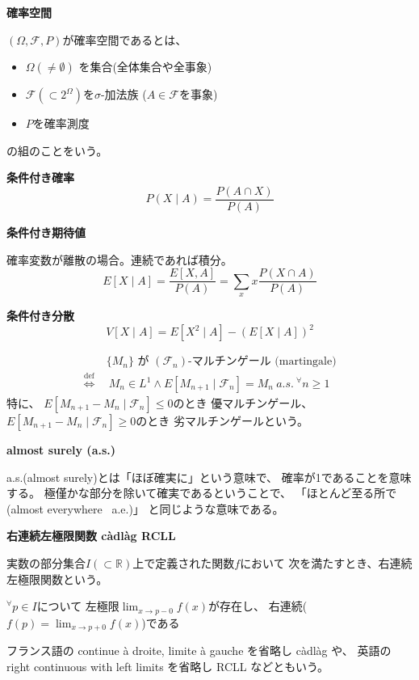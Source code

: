\documentclass[12pt,b5paper]{ltjsarticle}
\begin{document}
\hrulefill

\textbf{確率空間}

$(\Omega,\mathcal{F},P)$が確率空間であるとは、
\begin{itemize}
 \item $\Omega(\ne \emptyset)$ を集合(全体集合や全事象)
 \item $\mathcal{F}(\subset 2^{\Omega})$を$\sigma$-加法族
       ($A\in\mathcal{F}$を事象)
 \item $P$を確率測度
\end{itemize}
の組のことをいう。


\textbf{条件付き確率}
\begin{equation}
 P(X\mid A) = \frac{P(A\cap X)}{P(A)}
\end{equation}

\textbf{条件付き期待値}

確率変数が離散の場合。連続であれば積分。
\begin{equation}
 E[X\mid A] = \frac{E[X,A]}{P(A)}
  = \sum_{x}x\frac{P(X \cap A)}{P(A)}
\end{equation}

\textbf{条件付き分散}
\begin{equation}
 V[X\mid A]
  = E[X^2 \mid A] - (E[X\mid A])^2
\end{equation}

\textbf{
}

\begin{align}
 & \{M_{n}\}\text{ が }(\mathcal{F}_{n})\text{-マルチンゲール (martingale)}\\
  \stackrel{\mathrm{def}}{\Leftrightarrow} \ & \
  M_{n}\in L^1 \land E[ M_{n+1} \mid \mathcal{F}_{n}] =M_{n} \ a.s.\ {}^{\forall}n \geq 1
\end{align}
特に、
$E[M_{n+1}-M_{n} \mid \mathcal{F}_{n}]\leq 0$のとき
優マルチンゲール、
$E[M_{n+1}-M_{n} \mid \mathcal{F}_{n}]\geq 0$のとき
劣マルチンゲールという。


\textbf{almost surely (a.s.)}

a.s.(almost surely)とは「ほぼ確実に」という意味で、
確率が1であることを意味する。
極僅かな部分を除いて確実であるということで、
「ほとんど至る所で(almost everywhere \ a.e.)」
と同じような意味である。

\textbf{右連続左極限関数 c\`adl\`ag RCLL}

実数の部分集合$I(\subset\mathbb{R})$上で定義された関数$f$において
次を満たすとき、右連続左極限関数という。
\begin{center}
 $\displaystyle {}^{\forall}p\in I$について
左極限$\displaystyle \lim_{x\to p-0}f(x)$が存在し、
右連続($\displaystyle f(p)=\lim_{x\to p+0}f(x)$)である
\end{center}
フランス語の
continue \`a droite, limite \`a gauche
を省略し c\`adl\`ag
や、
英語の
right continuous with left limits
を省略し RCLL
などともいう。
\end{document}
